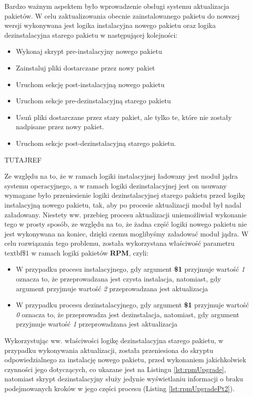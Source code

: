 Bardzo ważnym aspektem było wprowadzenie obsługi systemu aktualizacja pakietów. W celu zaktualizowania obecnie zainstalowanego pakietu do nowszej wersji wykonywana jest logika instalacyjna nowego pakietu oraz logika dezinstalacyjna starego pakietu w następującej kolejności:
\begin{itemize}
\item Wykonaj skrypt pre-instalacyjny nowego pakietu
\item Zainstaluj pliki dostarczane przez nowy pakiet
\item Uruchom sekcję post-instalacyjną nowego pakietu
\item Uruchom sekcje pre-dezinstalacyjną starego pakietu
\item Usuń pliki dostarczane przez stary pakiet, ale tylko te, które nie zostały nadpisane przez nowy pakiet.
\item Uruchom sekcje post-dezinstalacyjną starego pakietu.
\end{itemize}
TUTAJREF

Ze względu na to, że w ramach logiki instalacyjnej ładowany jest moduł jądra systemu operacyjnego, a w ramach logiki dezinstalacyjnej jest on usuwany wymagane było przeniesienie logiki dezinstalacyjnej starego pakietu przed logikę instalacyjną nowego pakietu, tak, aby po procesie aktualizacji moduł był nadal załadowany. Niestety ww. przebieg procesu aktualizacji uniemożliwiał wykonanie tego w prosty sposób, ze względu na to, że żadna część logiki nowego pakietu nie jest wykonywana na koniec, dzięki czemu moglibyśmy załadować moduł jądra. W celu rozwiązania tego problemu, została wykorzystana właściwość parametru textbf{\$1} w ramach logiki pakietów \textbf{RPM}, czyli:
\begin{itemize}
\item W przypadku procesu instalacyjnego, gdy argument \textbf{\$1} przyjmuje wartość \textit{1} oznacza to, że przeprowadzana jest czysta instalacja, natomiast, gdy argument przyjmuje wartość \textit{2} przeprowadzana jest aktualizacja
\item W przypadku procesu dezinstalacyjnego, gdy argument \textbf{\$1} przyjmuje wartość \textit{0} oznacza to, że przeprowadza jest dezinstalacja, natomiast, gdy argument przyjmuje wartość \textit{1} przeprowadzana jest aktualizacja
\end{itemize}

Wykorzystując ww. właściwości logikę dezinstalacyjna starego pakietu, w przypadku wykonywania aktualizacji, została przeniesiona do skryptu odpowiedzialnego za instalację nowego pakietu, przed wykonaniem jakichkolwiek czynności jego dotyczących, co ukazane jest na Listingu \ref{lst:rpmUpgrade}, natomiast skrypt dezinstalacyjny służy jedynie wyświetlaniu informacji o braku podejmowanych kroków w jego części procesu (Listing \ref{lst:rpmUpgradePt2}).

